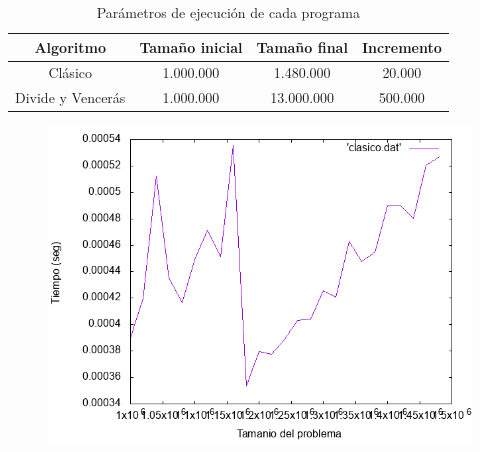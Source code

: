 \documentclass[12pt,spanish]{article}
\begin{document}
\begin{table}[H]
\centering
\begin{tabular}{|c|c|c|c|}
\hline
\textbf{Algoritmo}  & \textbf{Tamaño inicial} & \textbf{Tamaño final} & \textbf{Incremento}\\
\hline
Clásico & 1.000.000 & 1.480.000 & 20.000 \\
Divide y Vencerás & 1.000.000 & 13.000.000 & 500.000\\
\hline
\end{tabular}
\caption{Parámetros de ejecución de cada programa}
\end{table}

\begin{figure}[H]
\centering

\includegraphics[scale=0.75]{clasico.png}
\vskip 0.5cm


\end{figure}
\end{document}
